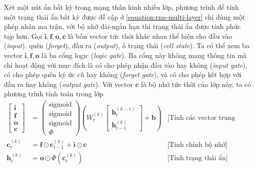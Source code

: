Xét một nút ẩn bất kỳ trong mạng thần kinh nhiều lớp, phương trình để tính một trạng thái ẩn bất kỳ được đề cập ở \ref{equation:rnn-multi-layer} chỉ dùng một phép nhân ma trận, với bộ nhớ dài-ngắn hạn thì trạng thái ẩn được tính phức tạp hơn. Gọi $\mathbf{i,f,o,c}$ là bốn vector tức thời khác nhau thể hiện cho đầu vào (\textit{input}), quên (\textit{forget}), đầu ra (\textit{output}), ô trạng thái (\textit{cell state}). Ta có thể xem ba vector $\mathbf{i,f,o}$ là ba cổng logic (\textit{logic gate}). Ba cổng này không mang thông tin mà chỉ hoạt động với mục đích là có cho phép nhận đầu vào hay không (\textit{input gate}), có cho phép quên ký ức cũ hay không (\textit{forget gate}), và có cho phép kết hợp với đầu ra hay không (\textit{output gate}). Với vector $\mathbf c$ là bộ nhớ tức thời của lớp này, ta có phương trình tính toán trong lớp
\begin{align}
    \begin{bmatrix}
        \mathbf i \\
        \mathbf f \\
        \mathbf o \\
        \mathbf c
    \end{bmatrix}
                      & =\begin{pmatrix}
                             \text{sigmoid} \\
                             \text{sigmoid} \\
                             \text{sigmoid} \\
                             \Phi
                         \end{pmatrix}
    \left(W^{(k)}_t
    \begin{bmatrix}
            \mathbf h_{t}^{(k-1)} \\
            \mathbf h_{t-1}^{(k)}
        \end{bmatrix} + \mathbf b
    \right)           & \text{[Tính các vector trung gian]}                                                        \\
    \mathbf c_t^{(k)} & =\mathbf f\odot\mathbf c_{t-1}^{(k)}+\mathbf i\odot\mathbf c & \text{[Tinh chỉnh bộ nhớ]}  \\
    \mathbf h_t^{(k)} & =\mathbf o\odot\Phi(\mathbf c_t^{(k)})                       & \text{[Tính trạng thái ẩn]}
\end{align}

